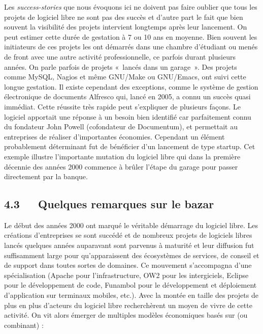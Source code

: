 \documentclass{FramateX}
\begin{document}
\begin{refsection}
Les \textit{success-stories} que nous évoquons ici ne doivent pas faire
oublier que tous les projets de logiciel libre ne sont pas des succès
et d'autre part le fait que bien souvent la visibilité des projets
intervient longtemps après leur lancement. On peut estimer cette durée
de gestation à 7 ou 10 ans en moyenne. Bien souvent les initiateurs de
ces projets les ont démarrés dans une chambre d'étudiant ou menés de
front avec une autre activité professionnelle, ce parfois durant
plusieurs années. On parle parfois de projets «~lancés dans un
garage~». Des projets comme MySQL, Nagios et même GNU/Make ou
GNU/Emacs, ont suivi cette longue gestation. Il existe cependant des
exceptions, comme le système de gestion électronique de documents
Alfresco qui, lancé en 2005, a connu un succès quasi immédiat. Cette
réussite très rapide peut s'expliquer de plusieurs
façons. Le logiciel apportait une réponse à un besoin bien identifié
car parfaitement connu du fondateur John Powell (cofondateur de
Documentum), et permettait au entreprises de réaliser d'importantes
économies. Cependant un élément probablement déterminant fut de
bénéficier d'un lancement de type startup. Cet exemple illustre
l'importante mutation du logiciel libre qui dans la première décennie
des années 2000 commence à brûler l'étape du garage pour passer
directement par la banque.

\subsection*{4.3~~~Quelques remarques sur le bazar}
{}

Le début des années 2000 ont marqué le véritable démarrage du logiciel
libre. Les créations d'entreprises se sont succédé et de nombreux
projets de logiciels libres lancés quelques années auparavant sont
parvenus à maturité et leur diffusion fut suffisamment large pour
qu'apparaissent des écosystèmes de services, de conseil et de support
dans toutes sortes de domaines. Ce mouvement
s'accompagna d'une spécialisation
(Apache pour l'infrastructure, OW2 pour les intergiciels, Eclipse pour
le développement de code, Funambol pour le développement et déploiement
d'application sur terminaux mobiles, etc.). Avec la montée en taille
des projets de plus en plus d'acteurs du logiciel libre recherchèrent
un moyen de vivre de cette activité. On vit alors émerger de multiples
modèles économiques basés sur (ou combinant) :


\end{refsection}
\end{document}
